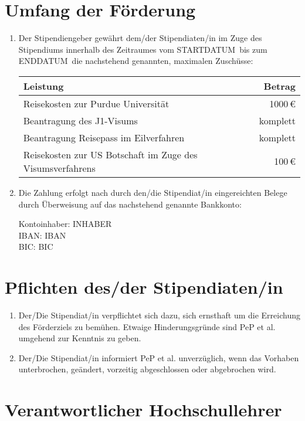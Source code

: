 \documentclass[
  paper=a4,
  fontsize=12pt,
  DIV=16,
  parskip=full,
  headinclude=true,
]{scrartcl}
\newcommand\stipstart{STARTDATUM} %
\newcommand\stipende{ENDDATUM}    %
\newcommand\stipkontoinhaber{INHABER}    %
\newcommand\stipbic{BIC}          %
\newcommand\stipiban{IBAN}
\begin{document}
\section{Umfang der Förderung}

\begin{enumerate}[\qquad(1)]
  \item Der Stipendiengeber gewährt dem/der Stipendiaten/in im Zuge des
    Stipendiums innerhalb des Zeitraumes vom \stipstart\ bis zum \stipende\
    die nachstehend genannten, maximalen Zuschüsse:

    \begin{tabular}{l r}
      \toprule
      Leistung & Betrag \\
      \midrule
      Reisekosten zur Purdue Universität & \num{1000}\,€ \\
      Beantragung des J1-Visums & komplett \\
      Beantragung Reisepass im Eilverfahren & komplett \\
      Reisekosten zur US Botschaft im Zuge des Visumsverfahrens &
        \num{100}\,€ \\
      \bottomrule
    \end{tabular}
  \item Die Zahlung erfolgt nach durch den/die Stipendiat/in eingereichten
    Belege durch Überweisung auf das nachstehend genannte Bankkonto:

    Kontoinhaber: \stipkontoinhaber \\
    IBAN: \stipiban \\
    BIC: \stipbic
\end{enumerate}

\section{Pflichten des/der Stipendiaten/in}

\begin{enumerate}[\qquad(1)]
  \item Der/Die Stipendiat/in verpflichtet sich dazu, sich ernsthaft um die
    Erreichung des Förderziels zu bemühen. Etwaige Hinderungsgründe sind
    PeP et al. umgehend zur Kenntnis zu geben.
  \item Der/Die Stipendiat/in informiert PeP et al. unverzüglich, wenn das
    Vorhaben unterbrochen, geändert, vorzeitig abgeschlossen oder
    abgebrochen wird.
\end{enumerate}

\section{Verantwortlicher Hochschullehrer}
\end{document}
